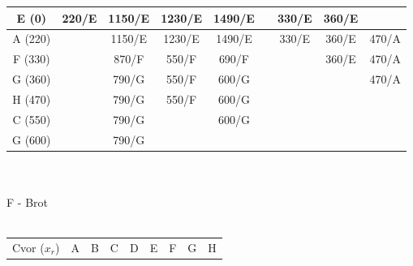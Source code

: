 \documentclass[12pt]{article}
\begin{document}
\begin{enumerate}
\begin{tabular}{|c|c|c|c|c|c|c|c|c|}
E (0)        & {\color[HTML]{FE0000} 220/E} & 1150/E                       & 1230/E                       & 1490/E                       & {\color[HTML]{333333} }  & 330/E                        & {\color[HTML]{333333} 360/E} &                              \\ \hline
A (220)      &                              & 1150/E                       & 1230/E                       & 1490/E                       &                          & {\color[HTML]{FE0000} 330/E} & 360/E                        & {\color[HTML]{333333} 470/A} \\ \hline
F (330)      &                              & 870/F                        & 550/F                        & {\color[HTML]{333333} 690/F} &                          &                              & {\color[HTML]{FE0000} 360/E} & {\color[HTML]{333333} 470/A} \\ \hline
G (360)      &                              & 790/G                        & {\color[HTML]{333333} 550/F} & {\color[HTML]{000000} 600/G} &                          & {\color[HTML]{FE0000} }      &                              & {\color[HTML]{FE0000} 470/A} \\ \hline
H (470)      &                              & 790/G                        & {\color[HTML]{FE0000} 550/F} & {\color[HTML]{333333} 600/G} & {\color[HTML]{FE0000} }  &                              &                              &                              \\ \hline
C (550)      & {\color[HTML]{FE0000} }      & 790/G                        & {\color[HTML]{FE0000} }      & {\color[HTML]{FE0000} 600/G} & {\color[HTML]{FE0000} }  &                              &                              &                              \\ \hline
G (600)      & {\color[HTML]{FE0000} }      & {\color[HTML]{FE0000} 790/G} &                              &                              &                          &                              &                              &                              \\ \hline
\end{tabular}
\\
\\
F - Brot
\\
\\
\begin{tabular}{|c|c|c|c|c|c|c|c|c|}
\hline
Cvor ($x_r$) & A                            & B                            & C                            & D                            & E                            & F                        & G                            & H                            \\ \cline{2-9} 

\end{tabular}
\end{enumerate}
\end{document}
